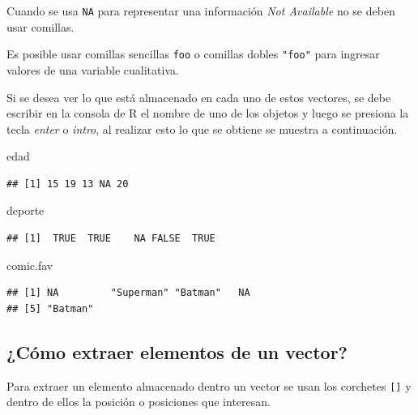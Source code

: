 \documentclass[10pt,]{krantz}
\makeatletter
\newenvironment{Shaded}{\begin{snugshade}}{\end{snugshade}}
\newcommand{\NormalTok}[1]{#1}
\let\proglang=\textsf
\newenvironment{kframe}{%
\medskip{}
\setlength{\fboxsep}{.8em}
 \def\at@end@of@kframe{}%
 \ifinner\ifhmode%
  \def\at@end@of@kframe{\end{minipage}}%
  \begin{minipage}{\columnwidth}%
 \fi\fi%
 \def\FrameCommand##1{\hskip\@totalleftmargin \hskip-\fboxsep
 \colorbox{shadecolor}{##1}\hskip-\fboxsep
     \hskip-\linewidth \hskip-\@totalleftmargin \hskip\columnwidth}%
 \MakeFramed {\advance\hsize-\width
   \@totalleftmargin\z@ \linewidth\hsize
   \@setminipage}}%
 {\par\unskip\endMakeFramed%
 \at@end@of@kframe}
\renewenvironment{Shaded}{\begin{kframe}}{\end{kframe}}
\let\BeginKnitrBlock\begin \let\EndKnitrBlock\end
\makeatother
\begin{document}
\BeginKnitrBlock{rmdwarning}
Cuando se usa \texttt{NA} para representar una información
\textit{Not Available} no se deben usar comillas.
\EndKnitrBlock{rmdwarning}

\BeginKnitrBlock{rmdnote}
Es posible usar comillas sencillas
\texttt{\textquotesingle{}foo\textquotesingle{}} o comillas dobles
\texttt{"foo"} para ingresar valores de una variable cualitativa.
\EndKnitrBlock{rmdnote}

Si se desea ver lo que está almacenado en cada uno de estos vectores, se
debe escribir en la consola de \proglang{R} el nombre de uno de los
objetos y luego se presiona la tecla \textit{enter} o \textit{intro}, al
realizar esto lo que se obtiene se muestra a continuación.

\begin{Shaded}
\begin{Highlighting}[]
\NormalTok{edad}
\end{Highlighting}
\end{Shaded}

\begin{verbatim}
## [1] 15 19 13 NA 20
\end{verbatim}

\begin{Shaded}
\begin{Highlighting}[]
\NormalTok{deporte}
\end{Highlighting}
\end{Shaded}

\begin{verbatim}
## [1]  TRUE  TRUE    NA FALSE  TRUE
\end{verbatim}

\begin{Shaded}
\begin{Highlighting}[]
\NormalTok{comic.fav}
\end{Highlighting}
\end{Shaded}

\begin{verbatim}
## [1] NA         "Superman" "Batman"   NA        
## [5] "Batman"
\end{verbatim}

\subsection{¿Cómo extraer elementos de un
vector?}\label{como-extraer-elementos-de-un-vector}

Para extraer un elemento almacenado dentro un vector se usan los
corchetes \texttt{{[}{]}} y dentro de ellos la posición o posiciones que
interesan.
\end{document}
